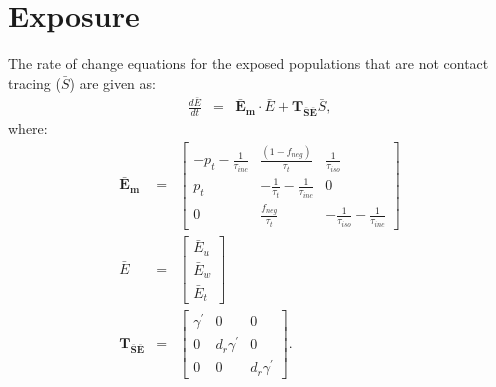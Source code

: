 \documentclass[notitlepage, superscriptaddress]{revtex4-2}
\begin{document}
\section{Exposure}
The rate of change equations for the exposed populations that are not contact tracing ($\bar{S}$) are given as:
\begin{eqnarray}
\frac{d\bar{E}}{dt} &=& \boldsymbol{\bar{E}_{m}} \cdot \bar{E} + \boldsymbol{T_{\bar{S}\bar{E}}}  \bar{S}, 
\end{eqnarray}
where:
\begin{eqnarray}
\boldsymbol{\bar{E}_{m}} &=&
\begin{bmatrix}
 - p_{t} -\frac{1}{\tau_{inc}}  &  \frac{(1-f_{neg})}{\tau_{t}}             & \frac{1}{\tau_{iso}} \\ 
 p_{t}              & -\frac{1}{\tau_{t}} -\frac{1}{\tau_{inc}}  & 0  \\ 
 0                  & \frac{f_{neg}}{\tau_{t}}                  & -\frac{1}{\tau_{iso}} -\frac{1}{\tau_{inc}}
\end{bmatrix} \\ 
%
\bar{E} &=& 
\begin{bmatrix}
\bar{E}_{u} \\ \bar{E}_{w}\\ \bar{E}_{t}
\end{bmatrix} \\
%
\boldsymbol{T_{\bar{S}\bar{E}}} &=& 
    \begin{bmatrix}
\gamma^{'}  & 0                 & 0 \\ 
 0          & d_{r} \gamma^{'}  & 0 \\ 
 0          & 0                 & d_{r} \gamma^{'} 
\end{bmatrix}.
%
\end{eqnarray}
\end{document}
